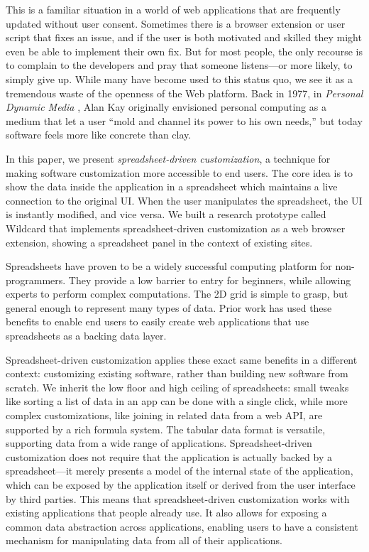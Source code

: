 \documentclass[english,submission]{programming}
\begin{document}
This is a familiar situation in a world of web applications that are
frequently updated without user consent. Sometimes there is a browser
extension or user script that fixes an issue, and if the user is both
motivated and skilled they might even be able to implement their own
fix. But for most people, the only recourse is to complain to the
developers and pray that someone listens---or more likely, to simply
give up. While many have become used to this status quo, we see it as a
tremendous waste of the openness of the Web platform. Back in 1977, in
\emph{Personal Dynamic Media} \autocite{kay1977}, Alan Kay originally
envisioned personal computing as a medium that let a user ``mold and
channel its power to his own needs,'' but today software feels more like
concrete than clay.

In this paper, we present \emph{spreadsheet-driven customization}, a
technique for making software customization more accessible to end
users. The core idea is to show the data inside the application in a
spreadsheet which maintains a live connection to the original UI. When
the user manipulates the spreadsheet, the UI is instantly modified, and
vice versa. We built a research prototype called Wildcard that
implements spreadsheet-driven customization as a web browser extension,
showing a spreadsheet panel in the context of existing sites.

Spreadsheets have proven to be a widely successful computing platform
for non-programmers. They provide a low barrier to entry for beginners,
while allowing experts to perform complex computations. The 2D grid is
simple to grasp, but general enough to represent many types of data.
Prior work \autocite{mccutchen2016,benson2014,chang2014} has used these
benefits to enable end users to easily create web applications that use
spreadsheets as a backing data layer.

Spreadsheet-driven customization applies these exact same benefits in a
different context: customizing existing software, rather than building
new software from scratch. We inherit the low floor and high ceiling of
spreadsheets: small tweaks like sorting a list of data in an app can be
done with a single click, while more complex customizations, like
joining in related data from a web API, are supported by a rich formula
system. The tabular data format is versatile, supporting data from a
wide range of applications. Spreadsheet-driven customization does not
require that the application is actually backed by a spreadsheet---it
merely presents a model of the internal state of the application, which
can be exposed by the application itself or derived from the user
interface by third parties. This means that spreadsheet-driven
customization works with existing applications that people already use.
It also allows for exposing a common data abstraction across
applications, enabling users to have a consistent mechanism for
manipulating data from all of their applications.
\end{document}
